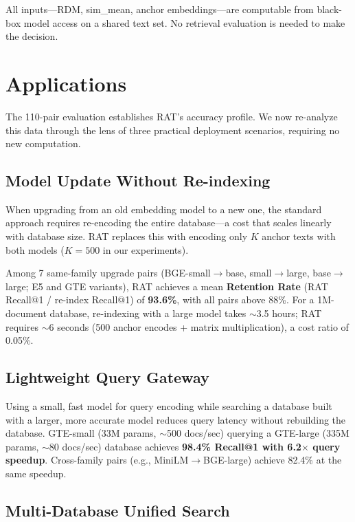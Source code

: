\documentclass{article}
\begin{document}
All inputs---RDM, sim\_mean, anchor embeddings---are computable from black-box model access on a shared text set. No retrieval evaluation is needed to make the decision.

\section{Applications}
\label{sec:applications}

The 110-pair evaluation establishes RAT's accuracy profile. We now re-analyze this data through the lens of three practical deployment scenarios, requiring no new computation.

\subsection{Model Update Without Re-indexing}

When upgrading from an old embedding model to a new one, the standard approach requires re-encoding the entire database---a cost that scales linearly with database size. RAT replaces this with encoding only $K$ anchor texts with both models ($K{=}500$ in our experiments).

Among 7 same-family upgrade pairs (BGE-small$\to$base, small$\to$large, base$\to$large; E5 and GTE variants), RAT achieves a mean \textbf{Retention Rate} (RAT Recall@1 / re-index Recall@1) of \textbf{93.6\%}, with all pairs above 88\%. For a 1M-document database, re-indexing with a large model takes $\sim$3.5 hours; RAT requires $\sim$6 seconds (500 anchor encodes + matrix multiplication), a cost ratio of 0.05\%.

\subsection{Lightweight Query Gateway}

Using a small, fast model for query encoding while searching a database built with a larger, more accurate model reduces query latency without rebuilding the database. GTE-small (33M params, $\sim$500 docs/sec) querying a GTE-large (335M params, $\sim$80 docs/sec) database achieves \textbf{98.4\% Recall@1 with 6.2$\times$ query speedup}. Cross-family pairs (e.g., MiniLM$\to$BGE-large) achieve 82.4\% at the same speedup.

\subsection{Multi-Database Unified Search}
\end{document}
